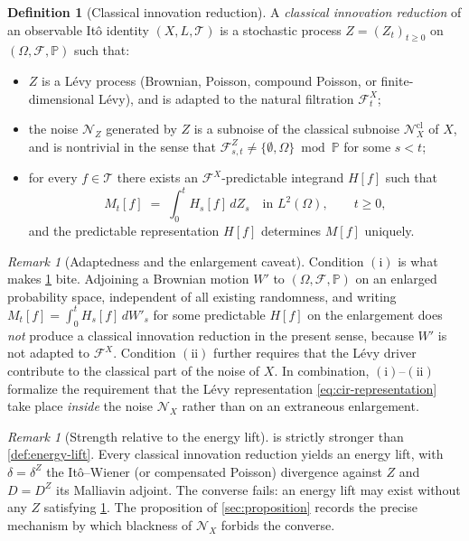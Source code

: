 \documentclass[11pt,reqno]{amsart}
\theoremstyle{plain}
\theoremstyle{definition}
\newtheorem{definition}[theorem]{Definition}
\theoremstyle{remark}
\newtheorem{remark}[theorem]{Remark}
\newcommand{\Prob}{\mathbb{P}}
\begin{document}
\begin{definition}[Classical innovation reduction]\label{def:cir}
A \emph{classical innovation reduction} of an observable It\^o
identity $(X,L,\mathcal T)$ is a stochastic process
$Z=(Z_t)_{t\ge 0}$ on $(\Omega,\mathcal F,\Prob)$ such that:
\begin{itemize}
\item[$(\mathrm i)$] $Z$ is a L\'evy process (Brownian, Poisson,
compound Poisson, or finite-dimensional L\'evy), and is adapted to
the natural filtration $\mathcal F^X_t$;
\item[$(\mathrm{ii})$] the noise $\mathcal N_Z$ generated by $Z$ is a
subnoise of the classical subnoise $\mathcal N_X^{\mathrm{cl}}$ of
$X$, and is nontrivial in the sense that
$\mathcal F^Z_{s,t}\neq\{\emptyset,\Omega\}\bmod\Prob$ for some $s<t$;
\item[$(\mathrm{iii})$] for every $f\in\mathcal T$ there exists an
$\mathcal F^X$-predictable integrand $H[f]$ such that
\begin{equation}\label{eq:cir-representation}
  M_t[f]\;=\;\int_0^t H_s[f]\,dZ_s\quad\text{in }L^2(\Omega),
  \qquad t\ge 0,
\end{equation}
and the predictable representation $H[f]$ determines $M[f]$ uniquely.
\end{itemize}
\end{definition}

\begin{remark}[Adaptedness and the enlargement caveat]\label{rem:cir-no-enlargement}
Condition $(\mathrm i)$ is what makes \cref{def:cir} bite. Adjoining
a Brownian motion $W'$ to $(\Omega,\mathcal F,\Prob)$ on an enlarged
probability space, independent of all existing randomness, and
writing $M_t[f]=\int_0^t H_s[f]\,dW'_s$ for some predictable $H[f]$
on the enlargement does \emph{not} produce a classical innovation
reduction in the present sense, because $W'$ is not adapted to
$\mathcal F^X$. Condition $(\mathrm{ii})$ further requires that the
L\'evy driver contribute to the classical part of the noise of $X$.
In combination, $(\mathrm i)$--$(\mathrm{ii})$ formalize the
requirement that the L\'evy representation
\eqref{eq:cir-representation} take place \emph{inside} the noise
$\mathcal N_X$ rather than on an extraneous enlargement.
\end{remark}

\begin{remark}[Strength relative to the energy lift]\label{rem:cir-vs-energy-lift}
 is strictly stronger than \cref{def:energy-lift}.
Every classical innovation reduction yields an energy lift, with
$\delta=\delta^Z$ the It\^o--Wiener (or compensated Poisson)
divergence against $Z$ and $D=D^Z$ its Malliavin adjoint. The
converse fails: an energy lift may exist without any $Z$ satisfying
\cref{def:cir}. The proposition of \cref{sec:proposition} records the
precise mechanism by which blackness of $\mathcal N_X$ forbids the
converse.
\end{remark}
\end{document}
